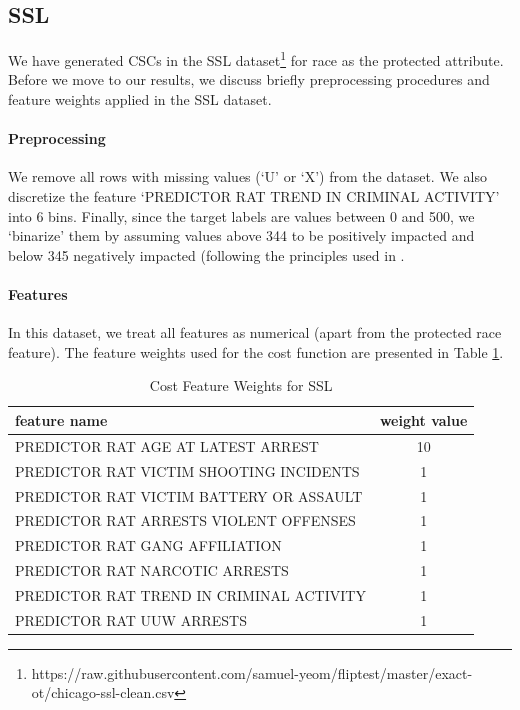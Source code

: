 \documentclass{article}
\begin{document}
\subsection{SSL}
We have generated CSCs in the SSL dataset\footnote{https://raw.githubusercontent.com/samuel-yeom/fliptest/master/exact-ot/chicago-ssl-clean.csv} for race as the protected attribute. Before we move to our results, we discuss briefly preprocessing procedures and feature weights applied in the SSL dataset.

\paragraph{Preprocessing} We remove all rows with missing values (`U' or `X') from the dataset. We also discretize the feature `PREDICTOR RAT TREND IN CRIMINAL ACTIVITY' into 6 bins. Finally, since the target labels are values between 0 and 500, we `binarize' them by assuming values above 344 to be positively impacted and below 345 negatively impacted (following the principles used in \cite{black2020fliptest}.


\paragraph{Features} In this dataset, we treat all features as numerical (apart from the protected race feature). The feature weights used for the cost function are presented in Table \ref{table:feature-weights-SSL}.
\begin{table}[ht]
    \small
    \centering
    \caption{Cost Feature Weights for SSL}
    \begin{tabular}{lc}
        \toprule
        \textbf{feature name} & \textbf{weight value} \\
        \midrule
        PREDICTOR RAT AGE AT LATEST ARREST & 10 \\
        PREDICTOR RAT VICTIM SHOOTING INCIDENTS & 1 \\
        PREDICTOR RAT VICTIM BATTERY OR ASSAULT & 1 \\
        PREDICTOR RAT ARRESTS VIOLENT OFFENSES & 1 \\
        PREDICTOR RAT GANG AFFILIATION & 1 \\
        PREDICTOR RAT NARCOTIC ARRESTS & 1 \\
        PREDICTOR RAT TREND IN CRIMINAL ACTIVITY & 1 \\
        PREDICTOR RAT UUW ARRESTS & 1 \\
        \bottomrule
    \end{tabular}
    \label{table:feature-weights-SSL}
\end{table}
\end{document}
